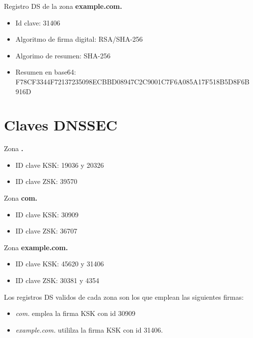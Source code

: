 \documentclass[11pt]{article}
\begin{document}
\medskip

Registro DS de la zona \textbf{example.com.}

\begin{itemize}
  \item Id clave: 31406
  \item Algoritmo de firma digital: RSA/SHA-256
  \item Algorimo de resumen: SHA-256
  \item Resumen en base64:\\
    F78CF3344F72137235098ECBBD08947C2C9001C7F6A085A17F518B5D8F6B916D
\end{itemize}


\section{Claves DNSSEC}

Zona \textbf{.}

\begin{itemize}
  \item ID clave KSK: 19036 y 20326
  \item ID clave ZSK: 39570
\end{itemize}

\medskip

Zona \textbf{com.}

\begin{itemize}
  \item ID clave KSK: 30909
  \item ID clave ZSK: 36707
\end{itemize}

\medskip

Zona \textbf{example.com.}

\begin{itemize}
  \item ID clave KSK: 45620 y 31406
  \item ID clave ZSK: 30381 y 4354
\end{itemize}

\medskip

Los registros DS validos de cada zona son los que emplean las siguientes firmas:

\begin{itemize}
  \item \textit{com.} emplea la firma KSK con id 30909
  \item \textit{example.com.} utililza la firma KSK con id 31406.
\end{itemize}
\end{document}
